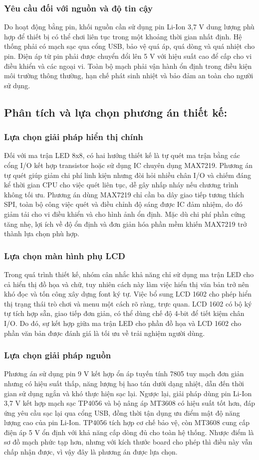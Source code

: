 \subsubsection{Yêu cầu đối với nguồn và độ tin cậy}
Do hoạt động bằng pin, khối nguồn cần sử dụng pin Li-Ion 3,7 V dung lượng phù hợp để thiết bị có thể chơi liên tục trong một khoảng thời gian nhất định. Hệ thống phải có mạch sạc qua cổng USB, bảo vệ quá áp, quá dòng và quá nhiệt cho pin. Điện áp từ pin phải được chuyển đổi lên 5 V với hiệu suất cao để cấp cho vi điều khiển và các ngoại vi. Toàn bộ mạch phải vận hành ổn định trong điều kiện môi trường thông thường, hạn chế phát sinh nhiệt và bảo đảm an toàn cho người sử dụng.
\subsection{Phân tích và lựa chọn phương án thiết kế:}
\subsubsection{Lựa chọn giải pháp hiển thị chính}
Đối với ma trận LED 8x8, có hai hướng thiết kế là tự quét ma trận bằng các cổng I/O kết hợp transistor hoặc sử dụng IC chuyên dụng MAX7219. Phương án tự quét giúp giảm chi phí linh kiện nhưng đòi hỏi nhiều chân I/O và chiếm đáng kể thời gian CPU cho việc quét liên tục, dễ gây nhấp nháy nếu chương trình không tối ưu. Phương án dùng MAX7219 chỉ cần ba dây giao tiếp tương thích SPI, toàn bộ công việc quét và điều chỉnh độ sáng được IC đảm nhiệm, do đó giảm tải cho vi điều khiển và cho hình ảnh ổn định. Mặc dù chi phí phần cứng tăng nhẹ, lợi ích về độ ổn định và đơn giản hóa phần mềm khiến MAX7219 trở thành lựa chọn phù hợp.
\subsubsection{Lựa chọn màn hình phụ LCD}
Trong quá trình thiết kế, nhóm cân nhắc khả năng chỉ sử dụng ma trận LED cho cả hiển thị đồ họa và chữ, tuy nhiên cách này làm việc hiển thị văn bản trở nên khó đọc và tốn công xây dựng font ký tự. Việc bổ sung LCD 1602 cho phép hiển thị trạng thái trò chơi và menu một cách rõ ràng, trực quan. LCD 1602 có bộ ký tự tích hợp sẵn, giao tiếp đơn giản, có thể dùng chế độ 4-bit để tiết kiệm chân I/O. Do đó, sự kết hợp giữa ma trận LED cho phần đồ họa và LCD 1602 cho phần văn bản được đánh giá là tối ưu về trải nghiệm người dùng.
\subsubsection{Lựa chọn giải pháp nguồn}
Phương án sử dụng pin 9 V kết hợp ổn áp tuyến tính 7805 tuy mạch đơn giản nhưng có hiệu suất thấp, năng lượng bị hao tán dưới dạng nhiệt, dẫn đến thời gian sử dụng ngắn và khó thực hiện sạc lại. Ngược lại, giải pháp dùng pin Li-Ion 3,7 V kết hợp mạch sạc TP4056 và bộ nâng áp MT3608 có hiệu suất tốt hơn, đáp ứng yêu cầu sạc lại qua cổng USB, đồng thời tận dụng ưu điểm mật độ năng lượng cao của pin Li-Ion. TP4056 tích hợp cơ chế bảo vệ, còn MT3608 cung cấp điện áp 5 V ổn định với khả năng cấp dòng đủ cho toàn hệ thống. Nhược điểm là sơ đồ mạch phức tạp hơn, nhưng với kích thước board cho phép thì điều này vẫn chấp nhận được, vì vậy đây là phương án được lựa chọn.
